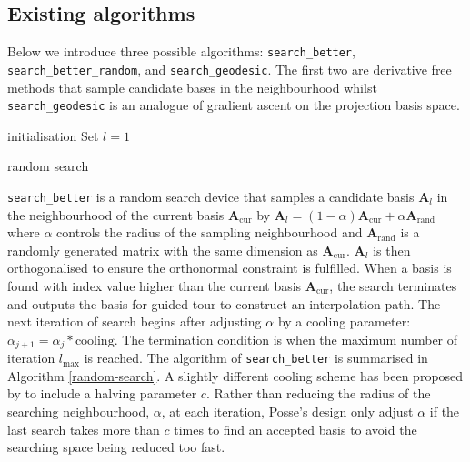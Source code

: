 \hypertarget{existing-algorithms}{%
\subsection{Existing algorithms}\label{existing-algorithms}}

Below we introduce three possible algorithms: \texttt{search\_better}, \texttt{search\_better\_random}, and \texttt{search\_geodesic}. The first two are derivative free methods that sample candidate bases in the neighbourhood whilst \texttt{search\_geodesic} is an analogue of gradient ascent on the projection basis space.

\begin{algorithm}
\SetAlgoLined
  initialisation\;
  Set $l = 1$\;
  \caption{random search}
  \label{random-search}
\end{algorithm}

\texttt{search\_better} is a random search device that samples a candidate basis \(\mathbf{A}_{l}\) in the neighbourhood of the current basis \(\mathbf{A}_{\text{cur}}\) by \(\mathbf{A}_{l} = (1- \alpha)\mathbf{A}_{\text{cur}} + \alpha \mathbf{A}_{\text{rand}}\) where \(\alpha\) controls the radius of the sampling neighbourhood and \(\mathbf{A}_{\text{rand}}\) is a randomly generated matrix with the same dimension as \(\mathbf{A}_{\text{cur}}\). \(\mathbf{A}_{l}\) is then orthogonalised to ensure the orthonormal constraint is fulfilled. When a basis is found with index value higher than the current basis \(\mathbf{A}_{\text{cur}}\), the search terminates and outputs the basis for guided tour to construct an interpolation path. The next iteration of search begins after adjusting \(\alpha\) by a cooling parameter: \(\alpha_{j+1} = \alpha_j * \text{cooling}\). The termination condition is when the maximum number of iteration \(l_{\max}\) is reached. The algorithm of \texttt{search\_better} is summarised in Algorithm \ref{random-search}. A slightly different cooling scheme has been proposed by \citet{posse1995projection} to include a halving parameter \(c\). Rather than reducing the radius of the searching neighbourhood, \(\alpha\), at each iteration, Posse's design only adjust \(\alpha\) if the last search takes more than \(c\) times to find an accepted basis to avoid the searching space being reduced too fast.

